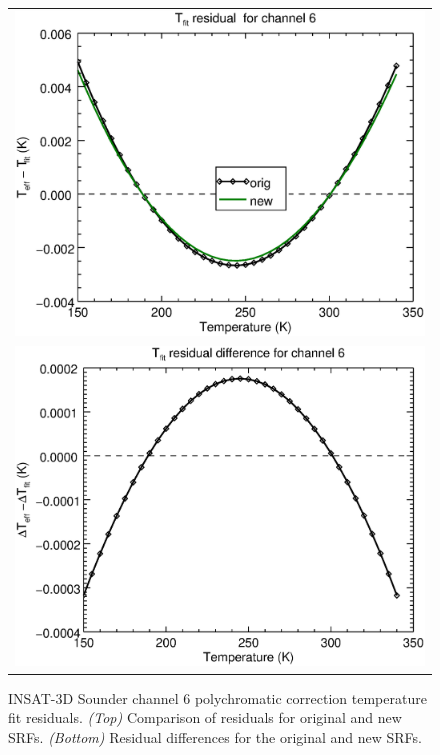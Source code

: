 \begin{figure}[H]
  \centering
  \begin{tabular}{c}
    \includegraphics[scale=0.55]{graphics/sndr/tfit/sndr_insat3d-6.tfit.eps} \\
    \includegraphics[scale=0.55]{graphics/sndr/tfit/sndr_insat3d-6.tfit.difference.eps}
  \end{tabular}
  \caption{INSAT-3D Sounder channel 6 polychromatic correction temperature fit residuals. \emph{(Top)} Comparison of residuals for original and new SRFs. \emph{(Bottom)} Residual differences for the original and new SRFs.}
  \label{fig:sndr_ch6_tfit}
\end{figure}


